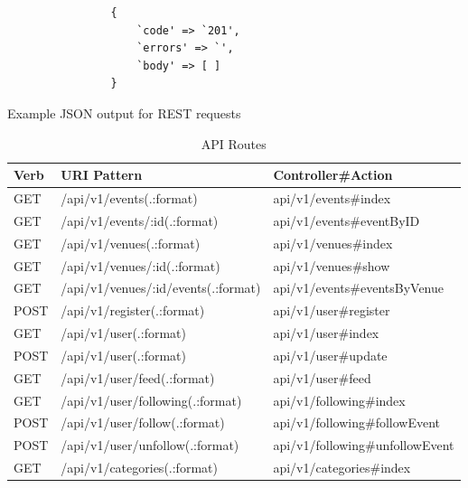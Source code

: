 			\begin{program}
				\begin{verbatim}
				{
					`code' => `201',
					`errors' => `',
					`body' => [ ]
				}
				\end{verbatim}
				\caption{Example JSON output for REST requests}
				\label{fig:JSONOutput}
			\end{program}

			\begin{table}[h]
				\centering
				\caption{API Routes}
				\begin{tabular}{|l|l|l|}
				\hline
				Verb &  URI Pattern                                      &  Controller\#Action                           \\ \hline
				GET  &    /api/v1/events(.:format)                       &                     api/v1/events\#index      \\
				GET  &    /api/v1/events/:id(.:format)                   &                 api/v1/events\#eventByID      \\
				GET  &     /api/v1/venues(.:format)                      &                      api/v1/venues\#index     \\
				GET  &     /api/v1/venues/:id(.:format)                  &                  api/v1/venues\#show          \\
				GET  &     /api/v1/venues/:id/events(.:format)           &           api/v1/events\#eventsByVenue        \\
				POST &    /api/v1/register(.:format)                     &                    api/v1/user\#register      \\
				GET  &     /api/v1/user(.:format)                        &                        api/v1/user\#index     \\
				POST &    /api/v1/user(.:format)                         &                       api/v1/user\#update     \\
				GET  &     /api/v1/user/feed(.:format)                   &                  api/v1/user\#feed            \\
				GET  &     /api/v1/user/following(.:format)              &              api/v1/following\#index          \\
				POST &    /api/v1/user/follow(.:format)                  &                 api/v1/following\#followEvent \\
				POST &    /api/v1/user/unfollow(.:format)                &               api/v1/following\#unfollowEvent \\ 
				GET  &    /api/v1/categories(.:format)                   &                  api/v1/categories\#index     \\

\end{tabular}
\end{table}
